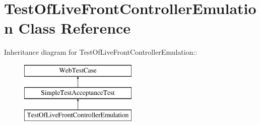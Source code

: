\hypertarget{class_test_of_live_front_controller_emulation}{
\section{TestOfLiveFrontControllerEmulation Class Reference}
\label{class_test_of_live_front_controller_emulation}
}
Inheritance diagram for TestOfLiveFrontControllerEmulation::\begin{figure}[H]
\begin{center}
\leavevmode
\includegraphics[height=3cm]{class_test_of_live_front_controller_emulation}
\end{center}
\end{figure}
